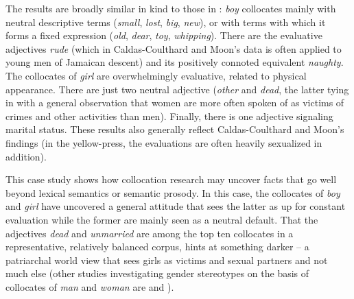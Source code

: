 The results are broadly similar in kind to those in \citet{caldas-coulthard_curvy_2010}: \textit{boy} collocates mainly with neutral descriptive terms (\textit{small}, \textit{lost}, \textit{big}, \textit{new}), or with terms with which it forms a fixed expression (\textit{old}, \textit{dear}, \textit{toy}, \textit{whipping}). There are the evaluative adjectives \textit{rude} (which in Caldas-Coulthard and Moon's data is often applied to young men of Jamaican descent) and its positively connoted equivalent \textit{naughty}. The collocates of \textit{girl} are overwhelmingly evaluative, related to physical appearance. There are just two neutral adjective (\textit{other} and \textit{dead}, the latter tying in with a general observation that women are more often spoken of as victims of crimes and other activities than men). Finally, there is one adjective signaling marital status. These results also generally reflect Caldas-Coulthard and Moon's findings (in the yellow-press, the evaluations are often heavily sexualized in addition).

This case study shows how collocation research may uncover facts that go well beyond lexical semantics or semantic prosody. In this case, the collocates of \textit{boy} and \textit{girl} have uncovered a general attitude that sees the latter as up for constant evaluation while the former are mainly seen as a neutral default. That the adjectives \textit{dead} and \textit{unmarried} are among the top ten collocates in a representative, relatively balanced corpus, hints at something darker -- a patriarchal world view that sees girls as victims and sexual partners and not much else (other studies investigating gender stereotypes on the basis of collocates of \textit{man} and \textit{woman} are \citet{gesuato_company_2003} and \citet{pearce_investigating_2008}).
